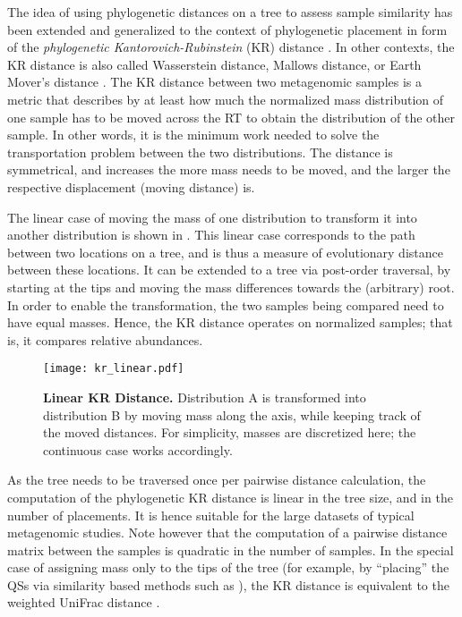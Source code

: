 The idea of using phylogenetic distances on a tree to assess sample similarity
has been extended and generalized to the context of phylogenetic placement
in form of the \emph{phylogenetic Kantorovich-Rubinstein} (KR) distance \cite{Matsen2011a,Evans2012}.
In other contexts, the KR distance is also called Wasserstein distance, Mallows distance, or Earth Mover's distance
\cite{Mallows1972,Rachev1985,Levina2001,Villani2008}.
The KR distance between two metagenomic samples is a metric that describes
by at least how much the normalized mass distribution of one sample has to be moved across the \ac{RT}
to obtain the distribution of the other sample.
In other words, it is the minimum work needed to solve the transportation problem between the two distributions.
The distance is symmetrical, and increases the more mass needs to be moved,
and the larger the respective displacement (moving distance) is.

The linear case of moving the mass of one distribution to transform it into another distribution
is shown in .
This linear case corresponds to the path between two locations on a tree,
and is thus a measure of evolutionary distance between these locations.
It can be extended to a tree via post-order traversal,
by starting at the tips and moving the mass differences towards the (arbitrary) root.
In order to enable the transformation, the two samples being compared need to have equal masses.
Hence, the KR distance operates on normalized samples; that is, it compares relative abundances.

\begin{figure}[!hptb]
    \centering
    \texttt{[image: kr\_linear.pdf]}
    \caption[Linear KR Distance]{
        \textbf{Linear KR Distance.}
        Distribution A is transformed into distribution B by moving mass along the axis,
        while keeping track of the moved distances.
        For simplicity, masses are discretized here; the continuous case works accordingly.
    }
    \label{fig:kr_linear}
\end{figure}

As the tree needs to be traversed once per pairwise distance calculation,
the computation of the phylogenetic KR distance is linear in the tree size, and in the number of placements.
It is hence suitable for the large datasets of typical metagenomic studies.
Note however that the computation of a pairwise distance matrix between the samples is quadratic in the number of samples.
In the special case of assigning mass only to the tips of the tree
(for example, by ``placing'' the \acp{QS} via similarity based methods such as ),
the KR distance is equivalent to the weighted UniFrac distance \cite{Evans2012}.

